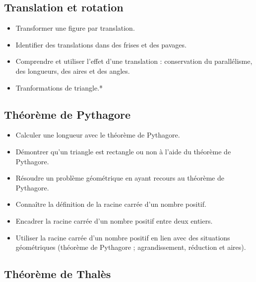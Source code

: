 \documentclass[a4paper,12pt,fleqn]{article}	
\begin{document}
\renewcommand{\labelitemi}{}

\subsection*{Translation et rotation}

\begin{itemize}
	\item {}Transformer une figure par translation.
	\item {}Identifier des translations dans des frises et des pavages.
	\item {}Comprendre et utiliser l’effet d’une translation : conservation du parallélisme, des longueurs, des aires et des angles.
	\item {}Tranformations de triangle.*
\end{itemize}

\subsection*{Théorème de Pythagore}

\begin{itemize}
	\item {}Calculer une longueur avec le théorème de Pythagore.
	\item {}Démontrer qu'un triangle est rectangle ou non à l'aide du théorème de Pythagore.
	\item {}Résoudre un problème géométrique en ayant recours au théorème de Pythagore.
	\item {}Connaître la définition de la racine carrée d’un nombre positif. %
	\item {}Encadrer la racine carrée d’un nombre positif entre deux entiers.%
	\item {}Utiliser la racine carrée d’un nombre positif en lien avec des situations géométriques (théorème de Pythagore ; agrandissement, réduction et aires).
\end{itemize}

\subsection*{Théorème de Thalès}
\end{document}
